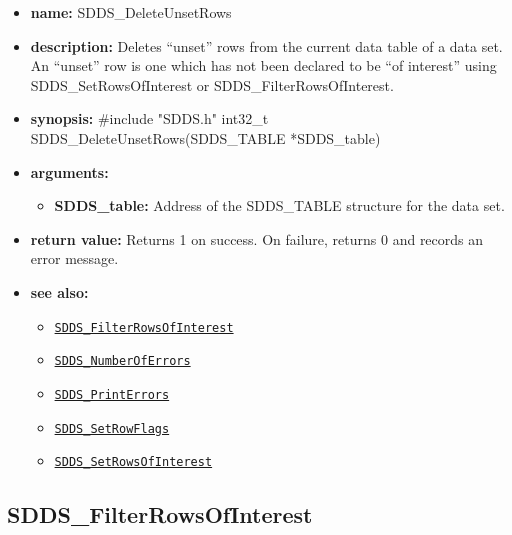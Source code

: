 \documentclass[11pt]{article}
\newcommand{\progref}[1]{\hyperref[SDDS_#1]{\tt SDDS\_#1}}
\begin{document}
\begin{itemize}
\item {\bf name:}\newline
SDDS\_DeleteUnsetRows
\item {\bf description:}\newline
Deletes ``unset'' rows from the current data table of a data set. An ``unset'' row is one which has not been declared to be ``of interest'' using SDDS\_SetRowsOfInterest or SDDS\_FilterRowsOfInterest.
\item {\bf synopsis:} \#include "SDDS.h"\newline
int32\_t SDDS\_DeleteUnsetRows(SDDS\_TABLE *SDDS\_table)
\item {\bf arguments:}
\begin{itemize}
\item {\bf SDDS\_table:} Address of the SDDS\_TABLE structure for the data set.
\end{itemize}
\item {\bf return value:}\newline
Returns 1 on success. On failure, returns 0 and records an error message.
\item {\bf see also:}
\begin{itemize}
\item \progref{FilterRowsOfInterest}
\item \progref{NumberOfErrors}
\item \progref{PrintErrors}
\item \progref{SetRowFlags}
\item \progref{SetRowsOfInterest}
\end{itemize}
\end{itemize}

\subsection{SDDS\_FilterRowsOfInterest}
\label{SDDS_FilterRowsOfInterest}
\end{document}
